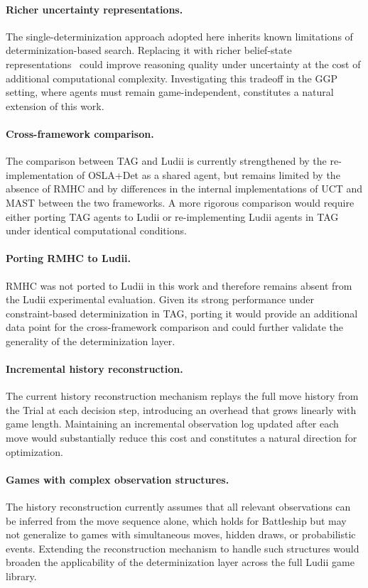 \paragraph{Richer uncertainty representations.}
The single-determinization approach adopted here inherits known limitations of 
determinization-based search. Replacing it with richer belief-state 
representations~\cite{morenville2025belief_constraints,morenville2024beliefsg} could 
improve reasoning quality under uncertainty at the cost of additional 
computational complexity. Investigating this tradeoff in the GGP setting, 
where agents must remain game-independent, constitutes a natural extension 
of this work.

\paragraph{Cross-framework comparison.}
The comparison between TAG and Ludii is currently strengthened by the 
re-implementation of OSLA+Det as a shared agent, but remains limited by the 
absence of RMHC and by differences in the internal implementations of UCT and 
MAST between the two frameworks. A more rigorous comparison would require 
either porting TAG agents to Ludii or re-implementing Ludii agents in TAG under 
identical computational conditions.

\paragraph{Porting RMHC to Ludii.}
RMHC was not ported to Ludii in this work and therefore remains absent from 
the Ludii experimental evaluation. Given its strong performance under 
constraint-based determinization in TAG, porting it would provide an 
additional data point for the cross-framework comparison and could further 
validate the generality of the determinization layer.

\paragraph{Incremental history reconstruction.}
The current history reconstruction mechanism replays the full move history 
from the Trial at each decision step, introducing an overhead that grows 
linearly with game length. Maintaining an incremental observation log updated 
after each move would substantially reduce this cost and constitutes a natural 
direction for optimization.

\paragraph{Games with complex observation structures.}
The history reconstruction currently assumes that all relevant observations 
can be inferred from the move sequence alone, which holds for Battleship but 
may not generalize to games with simultaneous moves, hidden draws, or 
probabilistic events. Extending the reconstruction mechanism to handle such 
structures would broaden the applicability of the determinization layer across 
the full Ludii game library.